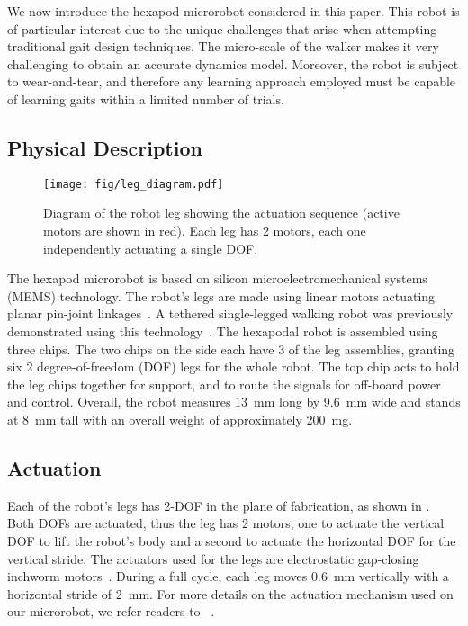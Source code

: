 We now introduce the hexapod microrobot considered in this paper.
This robot is of particular interest due to the unique challenges that arise when attempting traditional gait design techniques.
The micro-scale of the walker makes it very challenging to obtain an accurate dynamics model.
Moreover, the robot is subject to wear-and-tear, and therefore any learning approach employed must be capable of learning gaits within a limited number of trials.

\subsection{Physical Description}    
	\begin{figure}[t]
	  \centering
	  \texttt{[image: fig/leg\_diagram.pdf]}
	  \caption{Diagram of the robot leg showing the actuation sequence (active motors are shown in red). Each leg has 2 motors, each one independently actuating a single DOF. 
      }
	  \label{fig:leg_diagram}
	\end{figure}
	
	The hexapod microrobot is based on silicon microelectromechanical systems (MEMS) technology. 
	The robot's legs are made using linear motors actuating planar pin-joint linkages~\citep{Contreras2016DurabilityOS}. 
	A tethered single-legged walking robot was previously demonstrated using this technology~\citep{contreras_first_2017}. 
	The hexapodal robot is assembled using three chips.  
	The two chips on the side each have 3 of the leg assemblies, granting six 2 degree-of-freedom (DOF) legs for the whole robot. 
	The top chip acts to hold the leg chips together for support, and to route the signals for off-board power and control.
	Overall, the robot measures \SI{13}{\milli\meter} long by \SI{9.6}{\milli\meter} wide and stands at \SI{8}{\milli\meter} tall with an overall weight of approximately \SI{200}{\milli\gram}. 
 
\subsection{Actuation}
	Each of the robot's legs has 2-DOF in the plane of fabrication, as shown in .
	Both DOFs are actuated, thus the leg has 2 motors, one to actuate the vertical DOF to lift the robot's body and a second to actuate the horizontal DOF for the vertical stride. 
	The actuators used for the legs are electrostatic gap-closing inchworm motors~\cite{penskiy_optimized_2013}.
	During a full cycle, each leg moves \SI{0.6}{\milli\meter} vertically with a horizontal stride of \SI{2}{\milli\meter}. 
	For more details on the actuation mechanism used on our microrobot, we refer readers to ~\cite{Contreras2017DynamicsOE}.
	
